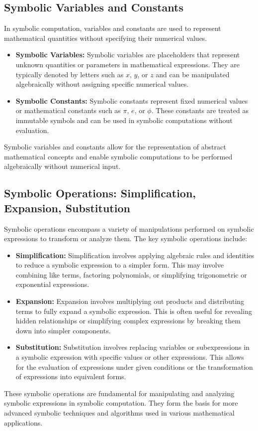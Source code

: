 \subsection{Symbolic Variables and Constants}

In symbolic computation, variables and constants are used to represent mathematical quantities without specifying their numerical values.
%
\begin{itemize}
  \item \textbf{Symbolic Variables:} Symbolic variables are placeholders that represent unknown quantities or parameters in mathematical expressions. They are typically denoted by letters such as \( x \), \( y \), or \( z \) and can be manipulated algebraically without assigning specific numerical values.
  \item \textbf{Symbolic Constants:} Symbolic constants represent fixed numerical values or mathematical constants such as \( \pi \), \( e \), or \( \phi \). These constants are treated as immutable symbols and can be used in symbolic computations without evaluation.
\end{itemize}
%
Symbolic variables and constants allow for the representation of abstract mathematical concepts and enable symbolic computations to be performed algebraically without numerical input.

\subsection{Symbolic Operations: Simplification, Expansion, Substitution}

Symbolic operations encompass a variety of manipulations performed on symbolic expressions to transform or analyze them. The key symbolic operations include:
%
\begin{itemize}
  \item \textbf{Simplification:} Simplification involves applying algebraic rules and identities to reduce a symbolic expression to a simpler form. This may involve combining like terms, factoring polynomials, or simplifying trigonometric or exponential expressions.
  \item \textbf{Expansion:} Expansion involves multiplying out products and distributing terms to fully expand a symbolic expression. This is often useful for revealing hidden relationships or simplifying complex expressions by breaking them down into simpler components.
  \item \textbf{Substitution:} Substitution involves replacing variables or subexpressions in a symbolic expression with specific values or other expressions. This allows for the evaluation of expressions under given conditions or the transformation of expressions into equivalent forms.
\end{itemize}
%
These symbolic operations are fundamental for manipulating and analyzing symbolic expressions in symbolic computation. They form the basis for more advanced symbolic techniques and algorithms used in various mathematical applications.

